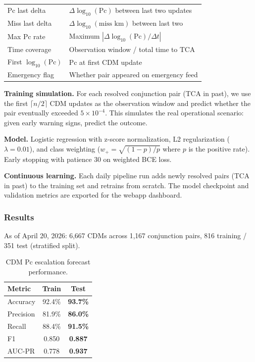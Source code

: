 \documentclass{article}
\begin{document}
\begin{table}[h]
\begin{tabular}{@{}ll@{}}
Pc last delta & $\Delta\log_{10}(\text{Pc})$ between last two updates \\
Miss last delta & $\Delta\log_{10}(\text{miss km})$ between last two \\
Max Pc rate & Maximum $|\Delta\log_{10}(\text{Pc})/\Delta t|$ \\
Time coverage & Observation window / total time to TCA \\
First $\log_{10}(\text{Pc})$ & Pc at first CDM update \\
Emergency flag & Whether pair appeared on emergency feed \\
\bottomrule
\end{tabular}
\end{table}

\textbf{Training simulation.} For each resolved conjunction pair (TCA in past), we use the first $\lceil n/2 \rceil$ CDM updates as the observation window and predict whether the pair eventually exceeded $5 \times 10^{-4}$. This simulates the real operational scenario: given early warning signs, predict the outcome.

\textbf{Model.} Logistic regression with z-score normalization, L2 regularization ($\lambda = 0.01$), and class weighting ($w_+ = \sqrt{(1 - p) / p}$ where $p$ is the positive rate). Early stopping with patience 30 on weighted BCE loss.

\textbf{Continuous learning.} Each daily pipeline run adds newly resolved pairs (TCA in past) to the training set and retrains from scratch. The model checkpoint and validation metrics are exported for the webapp dashboard.

\subsubsection{Results}
\label{sec:cdm-results}

As of April 20, 2026: 6,667 CDMs across 1,167 conjunction pairs, 816 training / 351 test (stratified split).

\begin{table}[h]
\centering
\caption{CDM Pc escalation forecast performance.}
\label{tab:cdm-results}
\begin{tabular}{@{}lcc@{}}
\toprule
Metric & Train & Test \\
\midrule
Accuracy & 92.4\% & \textbf{93.7\%} \\
Precision & 81.9\% & \textbf{86.0\%} \\
Recall & 88.4\% & \textbf{91.5\%} \\
F1 & 0.850 & \textbf{0.887} \\
AUC-PR & 0.778 & \textbf{0.937} \\
\bottomrule
\end{tabular}
\end{table}
\end{document}
